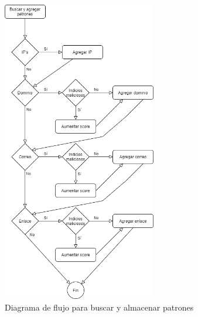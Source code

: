 \begin{figure}[htb]
    \centering
    \includegraphics[width=0.6\textwidth]{imagenes/DiagramasFlujo/Buscar_agregar_patrones.png}
\caption{Diagrama de flujo para buscar y almacenar patrones}
\label{fig:patrones}
\end{figure}

